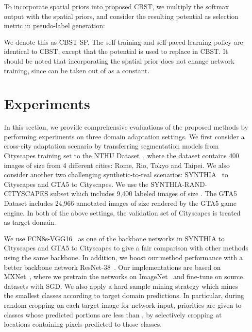 \documentclass[runningheads]{llncs}
\begin{document}
To incorporate spatial priors into proposed CBST, we multiply the softmax output with the spatial priors, and consider the resulting potential as selection metric in pseudo-label generation:

We denote this as CBST-SP. The self-training and self-paced learning policy are identical to CBST, except that the potential  is used to replace  in CBST. It should be noted that incorporating the spatial prior does not change network training, since  can be taken out of  as a constant.



\section{Experiments}
In this section, we provide comprehensive evaluations of the proposed methods by performing experiments on three domain adaptation settings. We first consider a cross-city adaptation scenario by transferring segmentation models from Cityscapes training set to the NTHU Dataset~\cite{Chen_2017_ICCV}, where the dataset contains 400 images of size  from 4 different cities: Rome, Rio, Tokyo and Taipei. We also consider another two challenging synthetic-to-real scenarios: SYNTHIA~\cite{ros2016synthia} to Cityscapes and GTA5 \cite{richter2016playing} to Cityscapes. We use the SYNTHIA-RAND-CITYSCAPES subset which includes 9,400 labeled images of size . The GTA5 Dataset includes 24,966 annotated images of size  rendered by the GTA5 game engine. In both of the above settings, the validation set of Cityscapes is treated as target domain.

We use FCN8s-VGG16~\cite{long2015fully} as one of the backbone networks in SYNTHIA to Cityscapes and GTA5 to Cityscapes to give a fair comparison with other methods using the same backbone. In addition, we boost our method performance with a better backbone network ResNet-38~\cite{wu2016wider}. Our implementations are based on MXNet~\cite{chen2015mxnet}, where we pretrain the networks on ImageNet~\cite{russakovsky2015imagenet} and fine-tune on source datasets with SGD. We also apply a hard sample mining strategy which mines the smallest classes according to target domain predictions. In particular, during random cropping on each target image for network input, priorities are given to classes whose predicted portions are less than , by selectively cropping at locations containing pixels predicted to those classes.
\end{document}
